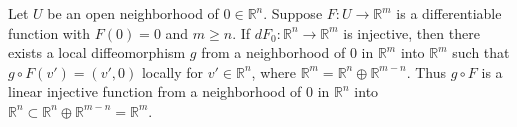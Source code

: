 Let $U$ be an open neighborhood of $0 \in \mathbb{R}^n$. Suppose $F: U \rightarrow \mathbb{R}^m$ is a differentiable function with $F(0) = 0$ and $m \geq n$. If $dF_0: \mathbb{R}^n \rightarrow \mathbb{R}^m$ is injective, then there exists a local diffeomorphism $g$ from a neighborhood of $0$ in $\mathbb{R}^m$ into $\mathbb{R}^m$ such that $g \circ F(v') = (v', 0)$ locally for $v' \in \mathbb{R}^n$, where $\mathbb{R}^m = \mathbb{R}^n \oplus \mathbb{R}^{m-n}$. Thus $g \circ F$ is a linear injective function from a neighborhood of $0$ in $\mathbb{R}^n$ into $\mathbb{R}^n \subset \mathbb{R}^n \oplus \mathbb{R}^{m-n} = \mathbb{R}^m$.
